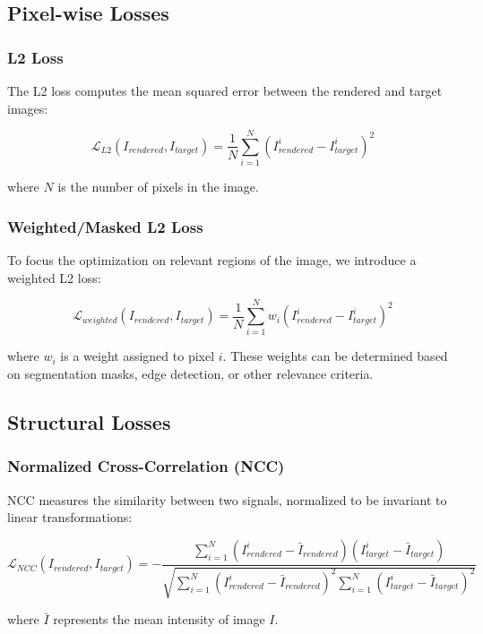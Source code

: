 \subsection{Pixel-wise Losses}
\subsubsection{L2 Loss}
The L2 loss computes the mean squared error between the rendered and target images:

\begin{equation}
\mathcal{L}_{L2}(I_{rendered}, I_{target}) = \frac{1}{N} \sum_{i=1}^{N} (I_{rendered}^i - I_{target}^i)^2
\end{equation}

where $N$ is the number of pixels in the image.

\subsubsection{Weighted/Masked L2 Loss}
To focus the optimization on relevant regions of the image, we introduce a weighted L2 loss:

\begin{equation}
\mathcal{L}_{weighted}(I_{rendered}, I_{target}) = \frac{1}{N} \sum_{i=1}^{N} w_i (I_{rendered}^i - I_{target}^i)^2
\end{equation}

where $w_i$ is a weight assigned to pixel $i$. These weights can be determined based on segmentation masks, edge detection, or other relevance criteria.

\subsection{Structural Losses}
\subsubsection{Normalized Cross-Correlation (NCC)}
NCC measures the similarity between two signals, normalized to be invariant to linear transformations:

\begin{equation}
\mathcal{L}_{NCC}(I_{rendered}, I_{target}) = -\frac{\sum_{i=1}^{N} (I_{rendered}^i - \bar{I}_{rendered})(I_{target}^i - \bar{I}_{target})}{\sqrt{\sum_{i=1}^{N} (I_{rendered}^i - \bar{I}_{rendered})^2 \sum_{i=1}^{N} (I_{target}^i - \bar{I}_{target})^2}}
\end{equation}

where $\bar{I}$ represents the mean intensity of image $I$.

